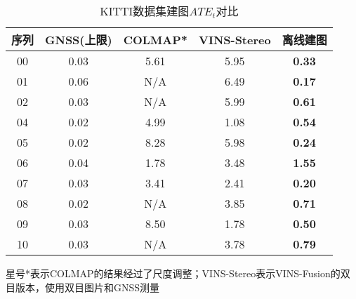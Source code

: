 \begin{table}[]
\centering
\caption{KITTI数据集建图$ATE_t$\textdownarrow{}对比}
\setlength{\tabcolsep}{5mm}
\begin{tabular}{c|c|ccc}
\toprule
序列 & GNSS(上限) & COLMAP*\cite{schonberger2016structure} & VINS-Stereo\cite{qin2019a} & 离线建图          \\ \midrule
00 & 0.03 & 5.61   & 5.95   & \cellcolor[HTML]{FA7F6F}\textbf{0.33} \\
01 & 0.06 & N/A    & 6.49   & \cellcolor[HTML]{FA7F6F}\textbf{0.17} \\
02 & 0.03 & N/A    & 5.99   & \cellcolor[HTML]{FA7F6F}\textbf{0.61} \\
04 & 0.02 & 4.99   & 1.08   & \cellcolor[HTML]{FA7F6F}\textbf{0.54} \\
05 & 0.02 & 8.28   & 5.98   & \cellcolor[HTML]{FA7F6F}\textbf{0.24} \\
06 & 0.04 & 1.78   & 3.48   & \cellcolor[HTML]{FA7F6F}\textbf{1.55} \\
07 & 0.03 & 3.41   & 2.41   & \cellcolor[HTML]{FA7F6F}\textbf{0.20} \\
08 & 0.02 & N/A    & 3.85   & \cellcolor[HTML]{FA7F6F}\textbf{0.71} \\
09 & 0.03 & 8.50   & 1.78   & \cellcolor[HTML]{FA7F6F}\textbf{0.50} \\
10 & 0.03 & N/A    & 3.78   & \cellcolor[HTML]{FA7F6F}\textbf{0.79} \\ \bottomrule
\end{tabular}
\label{tab:map_ate}
\begin{tablenotes}
  \footnotesize
  \item 星号*表示COLMAP的结果经过了尺度调整；VINS-Stereo表示VINS-Fusion的双目版本，使用双目图片和GNSS测量
\end{tablenotes}
\end{table}

